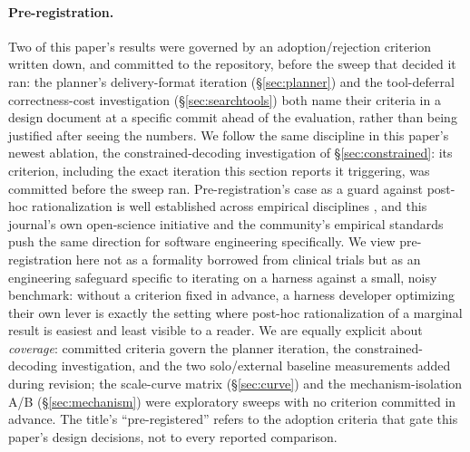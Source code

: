 \documentclass[smallcondensed,natbib]{svjour3}
\begin{document}
\paragraph{Pre-registration.} Two of this paper's results were governed
by an adoption/rejection criterion written down, and committed to the
repository, before the sweep that decided it ran: the planner's
delivery-format iteration (\S\ref{sec:planner}) and the tool-deferral
correctness-cost investigation (\S\ref{sec:searchtools}) both name their
criteria in a design document at a specific commit ahead of the
evaluation, rather than being justified after seeing the numbers. We
follow the same discipline in this paper's newest ablation, the
constrained-decoding investigation of \S\ref{sec:constrained}: its
criterion, including the exact iteration this section reports it
triggering, was committed before the sweep ran. Pre-registration's
case as a guard against post-hoc rationalization is well established
across empirical disciplines \citep{nosek2018preregistration}, and
this journal's own open-science initiative
\citep{mendez2019openscience} and the community's empirical standards
\citep{ralph2021standards} push the same direction for software
engineering specifically. We view pre-registration
here not as a formality borrowed from clinical trials but as an
engineering safeguard specific to iterating on a harness against a
small, noisy benchmark: without a criterion fixed in advance, a
harness developer optimizing their own lever is exactly the setting
where post-hoc rationalization of a marginal result is easiest and least
visible to a reader. We are equally explicit about \emph{coverage}:
committed criteria govern the planner iteration, the
constrained-decoding investigation, and the two solo/external baseline
measurements added during revision; the scale-curve matrix
(\S\ref{sec:curve}) and the mechanism-isolation A/B
(\S\ref{sec:mechanism}) were exploratory sweeps with no criterion
committed in advance. The title's ``pre-registered'' refers to the
adoption criteria that gate this paper's design decisions, not to
every reported comparison.
\end{document}
